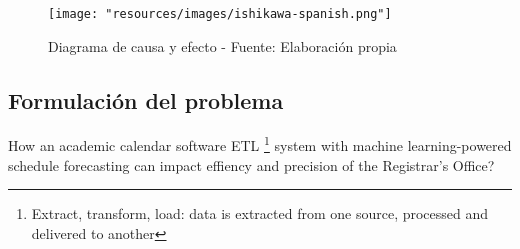 \begin{figure}[H]
    \centering
    \texttt{[image: "resources/images/ishikawa-spanish.png"]}
    \caption{Diagrama de causa y efecto - Fuente: Elaboración propia}
    \label{fig:image}
\end{figure}

\subsection{Formulación del problema}
How an academic calendar software ETL \footnote{Extract, transform, load: data is extracted from one source, processed and delivered to another} system with machine learning-powered schedule forecasting can impact effiency and precision of the Registrar's Office?
